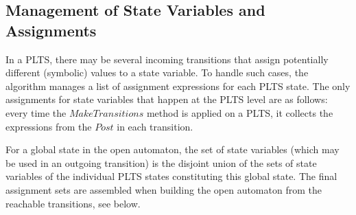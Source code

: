 \documentclass[smallcondensed]{svjour3}
\begin{document}



\subsection{Management of State Variables and Assignments}


In a PLTS, there may be several incoming transitions 
that assign potentially different (symbolic) values to a state variable.
To handle such cases, the algorithm manages a
list of assignment expressions for each PLTS state. 
The only assignments for state variables that happen at the PLTS level
are as follows: every time the $MakeTransitions$ method 
 is applied on a PLTS, it collects the expressions from the
$Post$ in each transition. 

For a global state in the open automaton, the set of state
variables (which may be used in an outgoing transition) 
is the disjoint union
of the sets of state variables of the individual PLTS states constituting this
global state. The final assignment sets are assembled when building the
open automaton from the reachable transitions, see below.
\end{document}
